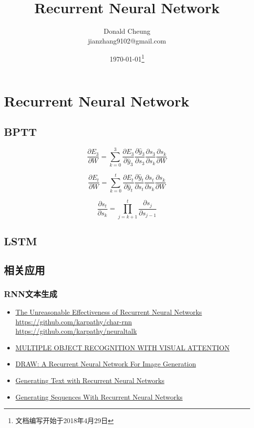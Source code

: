 \ifx\mlnotes\undefined
    \providecommand{\notesroot}{../..}

    \title{Recurrent Neural Network}
    \author{Donald Cheung\\jianzhang9102@gmail.com}
    \date{\today\footnote{文档编写开始于2018年4月29日}}

    
\fi

\chapter{Recurrent Neural Network}

\section{BPTT}
\[
    \frac{\partial E_3}{\partial W}=\sum_{k=0}^{3}{
        \frac{\partial E_3}{\partial \hat{y}_3}
        \frac{\partial \hat{y}_3}{\partial s_3}
        \frac{\partial s_3}{\partial s_k}
        \frac{\partial s_k}{\partial W}
    }
\]

\[
    \frac{\partial E_t}{\partial W}=\sum_{k=0}^{t}{
        \frac{\partial E_t}{\partial \hat{y}_t}
        \frac{\partial \hat{y}_t}{\partial s_t}
        \frac{\partial s_t}{\partial s_k}
        \frac{\partial s_k}{\partial W}
    }
\]

\[
    \frac{\partial s_t}{\partial s_k}=\prod_{j=k+1}^{t} \frac{\partial s_j}{\partial s_{j-1}}
\]

\section{LSTM}



\section{相关应用}

\subsection{RNN文本生成}
\begin{itemize}
    \item \href{https://karpathy.github.io/2015/05/21/rnn-effectiveness/}{The Unreasonable Effectiveness of Recurrent Neural Networks}
        \subitem \url{https://github.com/karpathy/char-rnn}
        \subitem \url{https://github.com/karpathy/neuraltalk}
    \item \href{https://arxiv.org/abs/1412.7755}{MULTIPLE OBJECT RECOGNITION WITH VISUAL ATTENTION}
    \item \href{https://arxiv.org/abs/1502.04623}{DRAW: A Recurrent Neural Network For Image Generation}
    \item \href{http://www.cs.utoronto.ca/~ilya/pubs/2011/LANG-RNN.pdf}{Generating Text with Recurrent Neural Networks}
\item \href{https://arxiv.org/abs/1308.0850}{Generating Sequences With Recurrent Neural Networks}
\end{itemize}


